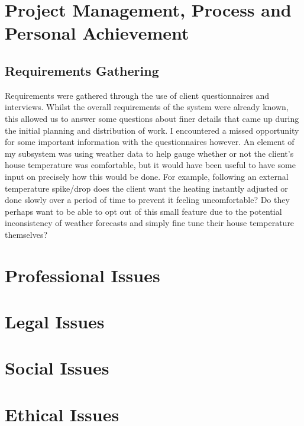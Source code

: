 \documentclass[]{report}
\begin{document}
\section{Project Management, Process and Personal Achievement}
\subsection{Requirements Gathering}
Requirements were gathered through the use of client questionnaires and interviews. Whilst the overall requirements of the system were already known, this allowed us to answer some questions about finer details that came up during the initial planning and distribution of work. I encountered a missed opportunity for some important information with the questionnaires however. An element of my subsystem was using weather data to help gauge whether or not the client's house temperature was comfortable, but it would have been useful to have some input on precisely how this would be done. For example, following an external temperature spike/drop does the client want the heating instantly adjusted or done slowly over a period of time to prevent it feeling uncomfortable? Do they perhaps want to be able to opt out of this small feature due to the potential inconsistency of weather forecasts and simply fine tune their house temperature themselves?

\section{Professional Issues}


\section{Legal Issues}


\section{Social Issues}


\section{Ethical Issues}

	
	
\end{document}

